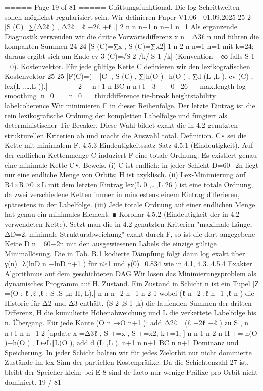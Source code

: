 \begin{MyVerbatim}
===== Page 19 of 81 =====
Glättungsfunktional. Die log Schrittweiten sollen möglichst regularisiert sein. Wir definieren
Paper V1.06 - 01.09.2025
25 2
[S (C)=∑(Δ2ℓ ) , Δ2ℓ =ℓ −2ℓ +ℓ .]
2 n n n+1 n n−1
n=1
Als ergänzende Diagnostik verwenden wir die dritte Vorwärtsdifferenz x n =Δ3ℓ n und führen die kompakten Summen
24 24
[S (C)=∑x , S (C)=∑x2]
1 n 2 n
n=1 n=1
mit k=24; daraus ergibt sich am Ende cv 3 (C)=√S 2 /k/|S 1 /k| (Konvention +∞ falls S 1 =0).
Kostenvektor. Für jede gültige Kette C definieren wir den lexikografischen Kostenvektor
25 25
[F(C)=( −|C| , S (C) , ∑|h(O )−h(O )|, ∑d (L ,L ), cv (C) , lex(L ,…,L )).]
 2  n+1 n BC n n+1  3   0 26
max.length log-smoothing n=0   n=0   thirddifference tie-break
heightstability labelcoherence
Wir minimieren F in dieser Reihenfolge. Der letzte Eintrag ist die rein lexikografische Ordnung der kompletten Labelfolge
und fungiert als deterministischer Tie-Breaker. Diese Wahl bildet exakt die in 4.2 genutzten strukturellen Kriterien ab und
macht die Auswahl total.
Definition. C⋆ sei die Kette mit minimalem F.
4.5.3 Eindeutigkeitssatz
Satz 4.5.1 (Eindeutigkeit). Auf der endlichen Kettenmenge C induziert F eine totale Ordnung. Es existiert genau eine
minimale Kette C⋆.
Beweis.
(i) C ist endlich: in jeder Schicht D=60−2n liegt nur eine endliche Menge von Orbits; H ist azyklisch.
(ii) Lex-Minimierung auf R4×R ≥0 ×L mit dem letzten Eintrag lex(L 0 ,…,L 26 ) ist eine totale Ordnung, da zwei
verschiedene Ketten immer in mindestens einem Eintrag differieren, spätestens in der Labelfolge.
(iii) Jede totale Ordnung auf einer endlichen Menge hat genau ein minimales Element. ∎
Korollar 4.5.2 (Eindeutigkeit der in 4.2 verwendeten Kette). Setzt man die in 4.2 genutzten Kriterien "maximale Länge,
ΔD=2, minimale Strukturabweichung" exakt durch F, so ist die dort angegebene Kette D n =60−2n mit den
ausgewiesenen Labels die einzige gültige Minimallösung. Die in Tab. B.1 kodierte Dämpfung folgt dann log exakt über
γ(n)=λ(lnD n −lnD n+1 ) für n≥1 und γ(0)=0.834 wie in 4.1, 4.3.
4.5.4 Exakter Algorithmus auf dem geschichteten DAG
Wir lösen das Minimierungsproblem als dynamisches Programm auf H.
Zustand. Ein Zustand in Schicht n ist ein Tupel
[Z =(O ; ℓ ,ℓ ,ℓ ; S ,S ,k; H, L),]
n n n−2 n−1 n 2 1
wobei (ℓ n−2 ,ℓ n−1 ,ℓ n ) die Historie für Δ2 und Δ3 enthält, (S 2 ,S 1 ,k) die laufenden Summen der dritten Differenz, H die
kumulierte Höhenabweichung und L die verkettete Labelfolge bis n.
Übergang. Für jede Kante (O n →O n+1 ):
add Δ2ℓ =(ℓ −2ℓ +ℓ ) zu S ,
n n+1 n n−1 2
[update x =Δ3ℓ , S +=x , S +=x2, k+=1, ]
n n 1 n 2 n
H +=|h(O )−h(O )|, L↦L∥L(O ), add d (L ,L ).
n+1 n n+1 BC n n+1
Dominanz und Speicherung. In jeder Schicht halten wir für jedes Zielorbit nur nicht dominierte Zustände im lex Sinn
der partiellen Kostenpräfixe. Da die Schichtenzahl 27 ist, bleibt der Speicher klein; bei E 8 sind de facto nur wenige
Präfixe pro Orbit nicht dominiert.
19 / 81


\end{MyVerbatim}
